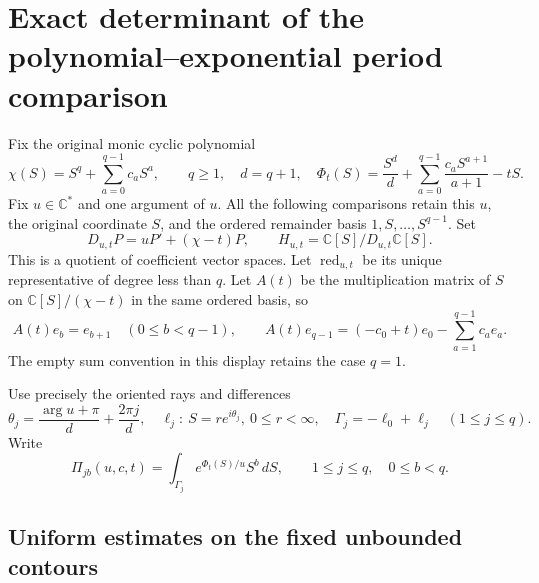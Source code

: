 \documentclass{article}
\begin{document}
\maketitle
\section{Exact determinant of the polynomial--exponential period comparison}
\label{sec:exponential-period-determinant-exact}

Fix the original monic cyclic polynomial
\[
 \chi(S)=S^q+\sum_{a=0}^{q-1}c_aS^a,\qquad q\geq1,
 \quad d=q+1,
 \quad\Phi_t(S)=\frac{S^d}{d}
       +\sum_{a=0}^{q-1}\frac{c_aS^{a+1}}{a+1}-tS.
\]
Fix $u\in\mathbb C^*$ and one argument of $u$. All the following
comparisons retain this $u$, the original coordinate $S$, and the
ordered remainder basis $1,S,\ldots,S^{q-1}$. Set
\[
 D_{u,t}P=uP'+(\chi-t)P,
 \qquad H_{u,t}=\mathbb C[S]/D_{u,t}\mathbb C[S].
\]
This is a quotient of coefficient vector spaces. Let
$\operatorname{red}_{u,t}$ be its unique representative of degree
less than $q$. Let $A(t)$ be the multiplication matrix of $S$ on
$\mathbb C[S]/(\chi-t)$ in the same ordered basis, so
\[
 A(t)e_b=e_{b+1}\quad(0\leq b<q-1),\qquad
 A(t)e_{q-1}=(-c_0+t)e_0-\sum_{a=1}^{q-1}c_ae_a.
 \tag{XD1}
\]
The empty sum convention in this display retains the case $q=1$.

Use precisely the oriented rays and differences
\[
 \theta_j=\frac{\arg u+\pi}{d}+\frac{2\pi j}{d},\quad
 \ell_j:\ S=re^{i\theta_j},\ 0\leq r<\infty,
 \quad\Gamma_j=-\ell_0+\ell_j\quad(1\leq j\leq q).
 \tag{XD2}
\]
Write
\[
 \Pi_{jb}(u,c,t)=\int_{\Gamma_j}e^{\Phi_t(S)/u}S^b\,dS,
 \qquad 1\leq j\leq q,\quad0\leq b<q.
 \tag{XD3}
\]

\subsection{Uniform estimates on the fixed unbounded contours}
\end{document}
